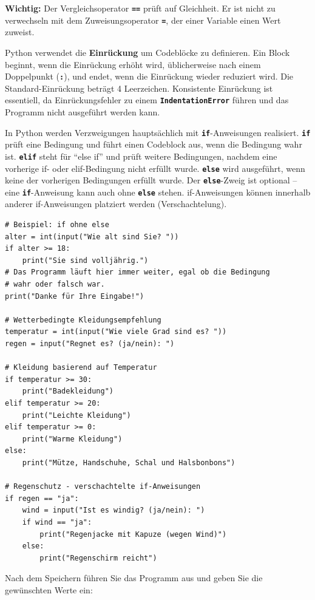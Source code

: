 \documentclass[ngerman,11pt]{article}
\begin{document}
\textbf{Wichtig:} Der Vergleichsoperator \textbf{\texttt{==}} prüft auf Gleichheit. Er ist nicht zu verwechseln mit dem Zuweisungsoperator \textbf{\texttt{=}}, der einer Variable einen Wert zuweist.


Python verwendet die \textbf{Einrückung} um Codeblöcke zu definieren. Ein Block beginnt, wenn die Einrückung erhöht wird, üblicherweise nach einem Doppelpunkt (\textbf{\texttt{:}}), und endet, wenn die Einrückung wieder reduziert wird. Die Standard-Einrückung beträgt 4 Leerzeichen. Konsistente Einrückung ist essentiell, da Einrückungsfehler zu einem \textbf{\texttt{IndentationError}} führen und das Programm nicht ausgeführt werden kann.

In Python werden Verzweigungen hauptsächlich mit \textbf{\texttt{if}}-Anweisungen realisiert. \textbf{\texttt{if}} prüft eine Bedingung und führt einen Codeblock aus, wenn die Bedingung wahr ist. \textbf{\texttt{elif}} steht für ``else if'' und prüft weitere Bedingungen, nachdem eine vorherige if- oder elif-Bedingung nicht erfüllt wurde. \textbf{\texttt{else}} wird ausgeführt, wenn keine der vorherigen Bedingungen erfüllt wurde. Der \textbf{\texttt{else}}-Zweig ist optional -- eine \textbf{\texttt{if}}-Anweisung kann auch ohne \textbf{\texttt{else}} stehen. if-Anweisungen können innerhalb anderer if-Anweisungen platziert werden (Verschachtelung).

\begin{lstlisting}[caption=verzweigungen.py]
# Beispiel: if ohne else
alter = int(input("Wie alt sind Sie? "))
if alter >= 18:
    print("Sie sind volljährig.")
# Das Programm läuft hier immer weiter, egal ob die Bedingung
# wahr oder falsch war.
print("Danke für Ihre Eingabe!")

# Wetterbedingte Kleidungsempfehlung
temperatur = int(input("Wie viele Grad sind es? "))
regen = input("Regnet es? (ja/nein): ")

# Kleidung basierend auf Temperatur
if temperatur >= 30:
    print("Badekleidung")
elif temperatur >= 20:
    print("Leichte Kleidung")
elif temperatur >= 0:
    print("Warme Kleidung")
else:
    print("Mütze, Handschuhe, Schal und Halsbonbons")

# Regenschutz - verschachtelte if-Anweisungen
if regen == "ja":
    wind = input("Ist es windig? (ja/nein): ")
    if wind == "ja":
        print("Regenjacke mit Kapuze (wegen Wind)")
    else:
        print("Regenschirm reicht")
\end{lstlisting}

\noindent Nach dem Speichern führen Sie das Programm aus und geben Sie die gewünschten Werte ein:
\end{document}
